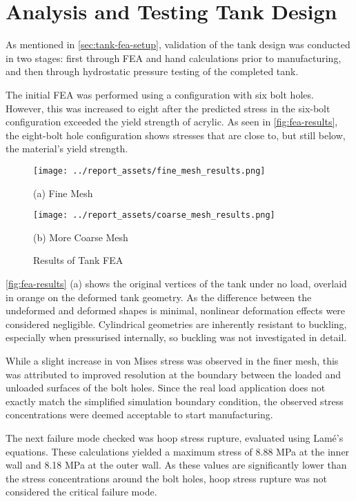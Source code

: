 \section{Analysis and Testing Tank Design}\label{sec:pressure-testing}
As mentioned in \autoref{sec:tank-fea-setup}, validation of the tank design was conducted in two stages: first through FEA and hand calculations prior to manufacturing, and then through hydrostatic pressure testing of the completed tank.

The initial FEA was performed using a configuration with six bolt holes. However, this was increased to eight after the predicted stress in the six-bolt configuration exceeded the yield strength of acrylic. As seen in \autoref{fig:fea-results}, the eight-bolt hole configuration shows stresses that are close to, but still below, the material's yield strength.
\begin{figure}[htbp]
    \centering

    \begin{minipage}{0.45\textwidth}
        \centering
        \texttt{[image: ../report\_assets/fine\_mesh\_results.png]}
        \caption*{(a) Fine Mesh}
    \end{minipage}    
    \hfill
    \begin{minipage}{0.45\textwidth}
        \centering
        \texttt{[image: ../report\_assets/coarse\_mesh\_results.png]}
        \caption*{(b) More Coarse Mesh}
    \end{minipage}    
    \caption{Results of Tank FEA}\label{fig:fea-results}

\end{figure}  
\autoref{fig:fea-results} (a) shows the original vertices of the tank under no load, overlaid in orange on the deformed tank geometry. As the difference between the undeformed and deformed shapes is minimal, nonlinear deformation effects were considered negligible. Cylindrical geometries are inherently resistant to buckling, especially when pressurised internally, so buckling was not investigated in detail.

While a slight increase in von Mises stress was observed in the finer mesh, this was attributed to improved resolution at the boundary between the loaded and unloaded surfaces of the bolt holes. Since the real load application does not exactly match the simplified simulation boundary condition, the observed stress concentrations were deemed acceptable to start manufacturing.

The next failure mode checked was hoop stress rupture, evaluated using Lamé's equations. These calculations yielded a maximum stress of 8.88 MPa at the inner wall and 8.18 MPa at the outer wall. As these values are significantly lower than the stress concentrations around the bolt holes, hoop stress rupture was not considered the critical failure mode.

